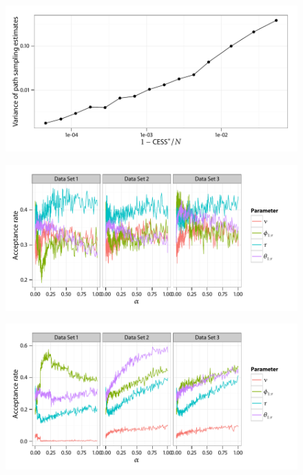 \documentclass[11pt, fontset=Minion]{mthesis}
\begin{document}
\begin{figure}
  \includegraphics[width=\linewidth]{CESS_Path_Var}
\end{figure}

\begin{figure}
  \includegraphics[width=\linewidth]{Adaptive_Proposal}
\end{figure}

\begin{figure}
  \includegraphics[width=\linewidth]{Fixed_Proposal}
\end{figure}
\end{document}
